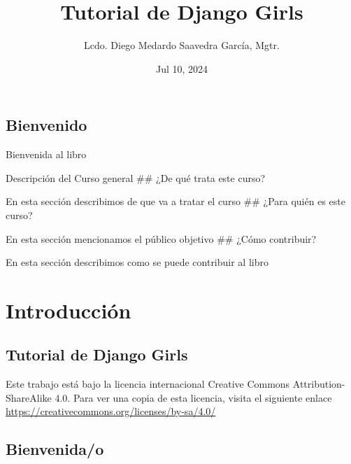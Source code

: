 \documentclass[
  a4paper,
  DIV=11,
  numbers=noendperiod,
  onepage,
  openany]{scrreprt}
\title{Tutorial de Django Girls}
\author{Lcdo. Diego Medardo Saavedra García, Mgtr.}
\date{Jul 10, 2024}
\renewcommand*\contentsname{Table of contents}
\newcommand\contentsname{Table of contents}
\begin{document}
\maketitle

\renewcommand*\contentsname{Table of contents}
{
\hypersetup{linkcolor=}
\setcounter{tocdepth}{2}
\tableofcontents
}


\chapter{Bienvenido}\label{bienvenido}

Bienvenida al libro

Descripción del Curso general \#\# ¿De qué trata este curso?

En esta sección describimos de que va a tratar el curso \#\# ¿Para quién
es este curso?

En esta sección mencionamos el público objetivo \#\# ¿Cómo contribuir?

En esta sección describimos como se puede contribuir al libro

\part{Introducción}

\chapter{Tutorial de Django Girls}\label{tutorial-de-django-girls}

\begin{tcolorbox}[enhanced jigsaw, breakable, opacityback=0, toptitle=1mm, bottomrule=.15mm, opacitybacktitle=0.6, colback=white, arc=.35mm, colframe=quarto-callout-tip-color-frame, left=2mm, colbacktitle=quarto-callout-tip-color!10!white, rightrule=.15mm, bottomtitle=1mm, titlerule=0mm, leftrule=.75mm, coltitle=black, toprule=.15mm, title=\textcolor{quarto-callout-tip-color}{\faLightbulb}\hspace{0.5em}{Tip}]

Este trabajo está bajo la licencia internacional Creative Commons
Attribution-ShareAlike 4.0. Para ver una copia de esta licencia, visita
el siguiente enlace
\url{https://creativecommons.org/licenses/by-sa/4.0/}

\end{tcolorbox}

\chapter{Bienvenida/o}\label{bienvenidao}
\end{document}
